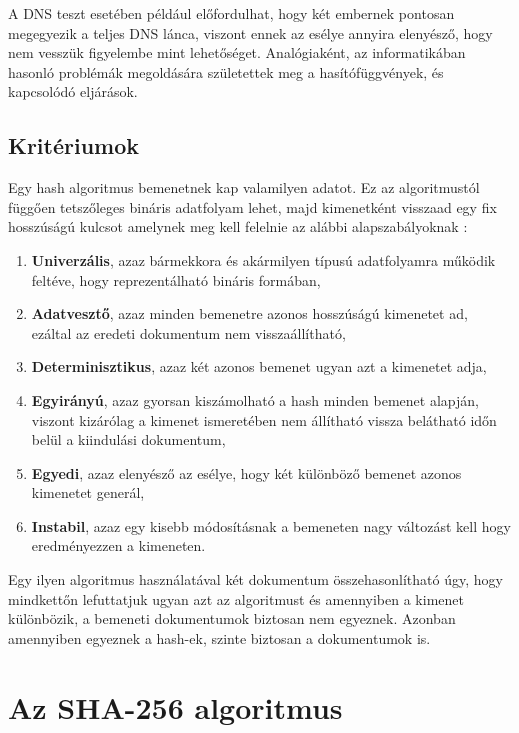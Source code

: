 A DNS teszt esetében például előfordulhat, hogy két embernek pontosan megegyezik a teljes DNS lánca, viszont ennek az esélye annyira elenyésző, hogy nem vesszük figyelembe mint lehetőséget. Analógiaként, az informatikában hasonló problémák megoldására születettek meg a hasítófüggvények, és kapcsolódó eljárások.


\subsection{Kritériumok}
\label{sec:criteries}

Egy hash algoritmus bemenetnek kap valamilyen adatot. Ez az algoritmustól függően tetszőleges bináris adatfolyam lehet, majd kimenetként visszaad egy fix hosszúságú kulcsot amelynek meg kell felelnie az alábbi alapszabályoknak \cite{preneel1993analysis}:

\begin{enumerate}
  \item \textbf{Univerzális}, azaz bármekkora és akármilyen típusú adatfolyamra működik feltéve, hogy reprezentálható bináris formában,
  \item \textbf{Adatvesztő}, azaz minden bemenetre azonos hosszúságú kimenetet ad, ezáltal az eredeti dokumentum nem visszaállítható,
  \item \textbf{Determinisztikus}, azaz két azonos bemenet ugyan azt a kimenetet adja,
  \item \textbf{Egyirányú}, azaz gyorsan kiszámolható a hash minden bemenet alapján, viszont kizárólag a kimenet ismeretében nem állítható vissza belátható időn belül a kiindulási dokumentum,
  \item \textbf{Egyedi}, azaz elenyésző az esélye, hogy két különböző bemenet azonos kimenetet generál,
  \item \textbf{Instabil}, azaz egy kisebb módosításnak a bemeneten nagy változást kell hogy eredményezzen a kimeneten.
\end{enumerate}

Egy ilyen algoritmus használatával két dokumentum összehasonlítható úgy, hogy mindkettőn lefuttatjuk ugyan azt az algoritmust és amennyiben a kimenet különbözik, a bemeneti dokumentumok biztosan nem egyeznek. Azonban amennyiben egyeznek a hash-ek, szinte biztosan a dokumentumok is.

\section{Az SHA-256 algoritmus}

